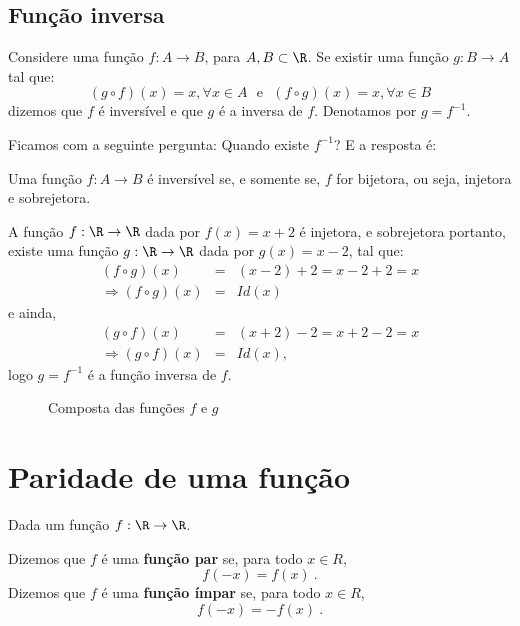 \subsection{Função inversa}

 Considere uma função $f: A \rightarrow B$, para $A, B \subset \R$. Se existir uma função $g: B \rightarrow A$ tal que:
 \[(g \circ f)(x)= x, \forall x \in A \ \ \ \text {e} \ \ \
 (f \circ g)(x)= x, \forall x \in B\]
 dizemos que $f$ é inversível e que $g$ é a inversa de $f$. Denotamos por $g= f^{-1}$.

 Ficamos com a seguinte pergunta: Quando existe $f^{-1}$? E a resposta é:

 \vskip0.3cm

 \colorbox{azul}{
 \begin{minipage}{0.9\linewidth}
 \begin{center}
 Uma função $f: A \to B$ é inversível se, e somente se, $f$ for bijetora, ou seja, injetora e sobrejetora.
 \end{center}
 \end{minipage}}

 \vskip0.3cm

\begin{exem}
 A função $f: \R \rightarrow \R$ dada por $f(x)= x+2$ é injetora, e sobrejetora portanto, existe uma função $g: \R \rightarrow \R$ dada por $g(x)= x-2$, tal que:
\begin{eqnarray}
(f \circ g)(x)&=& (x-2) + 2= x-2+2= x \\
\Rightarrow (f \circ g)(x)&=& Id(x)
\end{eqnarray}
e ainda,
\begin{eqnarray}
(g \circ f)(x)&=& (x+2) - 2= x+2-2= x \\
\Rightarrow (g \circ f)(x)&=& Id(x) ,
\end{eqnarray}
logo $g= f^{-1}$ é a função inversa de $f$.

 \begin{figure}[H]
 \centering
    \caption{Composta das funções $f$ e $g$}
  \end{figure}

\end{exem}


\section{Paridade de uma função}

 \vskip0.3cm
 \colorbox{azul}{
 \begin{minipage}{0.9\linewidth}
 \begin{center}
  Dada um função $f: \R \rightarrow \R$.

  Dizemos que $f$ é uma \textbf{função par} se, para todo $x \in R$,
\begin{equation}
f(-x)= f(x) \ .
\end{equation}
  Dizemos que $f$ é uma \textbf{função ímpar} se, para todo $x \in R$,
\begin{equation}
f(-x)= - f(x) \ .
\end{equation}
 \end{center}
 \end{minipage}}
 \vskip0.3cm


